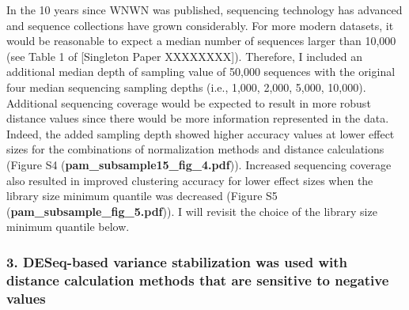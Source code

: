 \documentclass[
]{article}
\begin{document}
In the 10 years since WNWN was published, sequencing technology has
advanced and sequence collections have grown considerably. For more
modern datasets, it would be reasonable to expect a median number of
sequences larger than 10,000 (see Table 1 of {[}Singleton Paper
XXXXXXXX{]}). Therefore, I included an additional median depth of
sampling value of 50,000 sequences with the original four median
sequencing sampling depths (i.e., 1,000, 2,000, 5,000, 10,000).
Additional sequencing coverage would be expected to result in more
robust distance values since there would be more information represented
in the data. Indeed, the added sampling depth showed higher accuracy
values at lower effect sizes for the combinations of normalization
methods and distance calculations (Figure S4
(\textbf{pam\_subsample15\_fig\_4.pdf})). Increased sequencing coverage
also resulted in improved clustering accuracy for lower effect sizes
when the library size minimum quantile was decreased (Figure S5
(\textbf{pam\_subsample\_fig\_5.pdf})). I will revisit the choice of the
library size minimum quantile below.

\hypertarget{deseq-based-variance-stabilization-was-used-with-distance-calculation-methods-that-are-sensitive-to-negative-values}{%
\subsubsection{3. DESeq-based variance stabilization was used with
distance calculation methods that are sensitive to negative
values}\label{deseq-based-variance-stabilization-was-used-with-distance-calculation-methods-that-are-sensitive-to-negative-values}}
\end{document}
